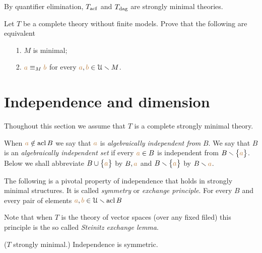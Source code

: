 By quantifier elimination, $T_{\rm acf}$ and $T_{\rm dag}$ are strongly minimal theories.

\begin{exercise}
Let $T$ be a complete theory without finite models. Prove that the following are equivalent
\begin{itemize}
\item[1.] $M$ is minimal;
\item[2.] ${\color{brown} a}\equiv_M{\color{brown} b}$ for every ${\color{brown} a}, {\color{brown} b}\in \EuScript U\smallsetminus M$.\QED
\end{itemize}
\end{exercise}















\section{Independence and dimension}

Thoughout this section we assume that $T$ is a complete strongly minimal theory.  

When ${\color{brown} a}\notin\mathop{\rm acl} B$ we say that ${\color{brown} a}$ is \emph{algebraically independent from\/} $B$. We say that $B$ is an \emph{algebraically independent set\/} if every ${\color{brown} a}\in B$ is independent from $B\smallsetminus\big\{{\color{brown} a}\big\}$. Below we shall abbreviate $B\cup\big\{{\color{brown} a}\big\}$ by \emph{$B,{\color{brown} a}$} and  $B\smallsetminus\big\{{\color{brown} a}\big\}$ by \emph{$B\smallsetminus{\color{brown}a}$}. 

The following is a pivotal property of independence that holds in strongly minimal structures. It is called \emph{symmetry\/} or \emph{exchange principle}. For every $B$ and every pair of elements ${\color{brown} a},{\color{brown} b}\in\EuScript U\smallsetminus\mathop{\rm acl} B$


Note that when $T$ is the theory of vector spaces (over any fixed filed) this principle is the so called \emph{Steinitz exchange lemma}.

\begin{theorem} 
($T$ strongly minimal.) Independence is symmetric.
\end{theorem} 

